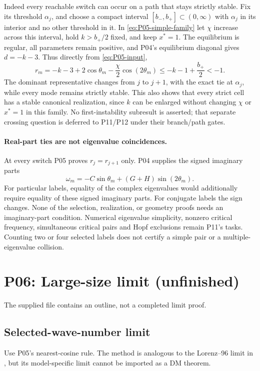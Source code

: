 \documentclass[11pt]{article}
\let\OriginalCite\cite
\renewcommand{\cite}[2][]{%
  \textcolor{CitationRed}{%
    \if\relax\detokenize{#1}\relax
      \OriginalCite{#2}%
    \else
      \OriginalCite[#1]{#2}%
    \fi}}
\theoremstyle{definition}
\theoremstyle{remark}
\begin{document}
Indeed every reachable switch can occur on a path that stays strictly
stable. Fix its threshold $\alpha_j$, and choose a compact interval
$[b_-,b_+]\subset(0,\infty)$ with $\alpha_j$ in its interior and no
other threshold in it. In \eqref{eq:P05-simple-family} let $\chi$
increase across this interval, hold $k>b_+/2$ fixed, and keep $x^*=1$.
The equilibrium is regular, all parameters remain positive, and P04's
equilibrium diagonal gives $d=-k-3$. Thus directly from
\eqref{eq:P05-input},
\begin{equation}
 r_m=-k-3+2\cos\theta_m-\frac\chi2\cos(2\theta_m)
       \le-k-1+\frac{b_+}{2}<-1.
 \label{eq:P05-stable-switch}
\end{equation}
The dominant representative changes from $j$ to $j+1$, with the exact
tie at $\alpha_j$, while every mode remains strictly stable. This also
shows that every strict cell has a stable canonical realization, since
$k$ can be enlarged without changing $\chi$ or $x^*=1$ in this family.
No first-instability subresult is asserted; that separate crossing question
is deferred to P11/P12 under their branch/path gates.

\paragraph{Real-part ties are not eigenvalue coincidences.}
At every switch P05 proves $r_j=r_{j+1}$ only. P04 supplies the signed
imaginary parts
\[
 \omega_m=-C\sin\theta_m+(G+H)\sin(2\theta_m).
\]
For particular labels, equality of the complex eigenvalues would additionally
require equality of these signed imaginary parts. For conjugate labels the
sign changes. None of the selection, realization, or geometry proofs needs
an imaginary-part condition. Numerical eigenvalue simplicity, nonzero
critical frequency, simultaneous critical pairs and Hopf exclusions remain
P11's tasks. Counting two or four selected labels does not certify a simple
pair or a multiple-eigenvalue collision.


\section{P06: Large-size limit (unfinished)}
\label{sec:P06}
The supplied file contains an outline, not a completed limit proof.
\subsection{Selected-wave-number limit}\label{slot:P06-1}
Use P05's nearest-cosine rule. The method is analogous to the
Lorenz--96 limit in \cite[Proposition~6]{vanKekemSterk2018}, but
its model-specific limit cannot be imported as a DM theorem.
\end{document}
